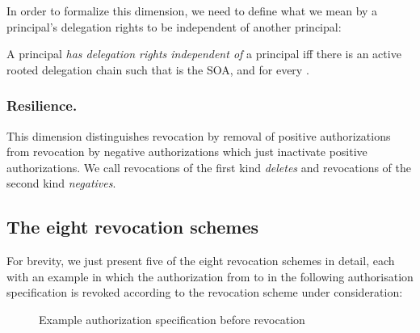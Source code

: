 \documentclass[runningheads]{llncs}
\begin{document}
In order to formalize this dimension, we need to define what we mean by a principal's delegation rights to be independent of another principal:
\begin{definition}
 A principal  \emph{has delegation rights independent of} a principal  iff there is an active rooted delegation chain  such that  is the SOA,  and  for every .
\end{definition}


\subsubsection{Resilience.} 
This dimension distinguishes revocation by removal of positive authorizations from revocation by negative authorizations which just inactivate positive authorizations. We call revocations of the first kind \emph{deletes} and revocations of the second kind \emph{negatives}.


\subsection{The eight revocation schemes}
For brevity, we just present five of the eight revocation schemes in detail, each with an example in which the authorization from  to  in the following authorisation specification is revoked according to the revocation scheme under consideration:

\vspace{-3mm}
\begin{figure}[H]
\center
{}
\caption{Example authorization specification before revocation}
\end{figure}
\vspace{-7mm}
\end{document}
